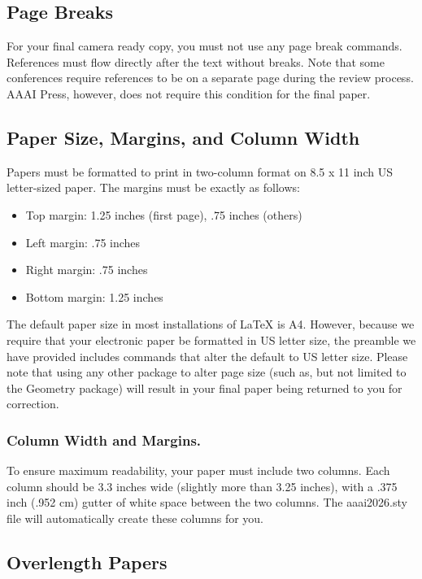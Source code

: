 \subsection{Page Breaks}

For your final camera ready copy, you must not use any page break
commands. References must flow directly after the text without breaks.
Note that some conferences require references to be on a separate page
during the review process. AAAI Press, however, does not require this
condition for the final paper.

\subsection{Paper Size, Margins, and Column Width}

Papers must be formatted to print in two-column format on 8.5 x 11 inch
US letter-sized paper. The margins must be exactly as follows:

\begin{itemize}
\item Top margin: 1.25 inches (first page), .75 inches (others)
\item Left margin: .75 inches
\item Right margin: .75 inches
\item Bottom margin: 1.25 inches
\end{itemize}

The default paper size in most installations of \LaTeX{} is A4. However,
because we require that your electronic paper be formatted in US letter
size, the preamble we have provided includes commands that alter the
default to US letter size. Please note that using any other package to
alter page size (such as, but not limited to the Geometry package) will
result in your final paper being returned to you for correction.

\subsubsection{Column Width and Margins.}

To ensure maximum readability, your paper must include two columns. Each
column should be 3.3 inches wide (slightly more than 3.25 inches), with
a .375 inch (.952 cm) gutter of white space between the two columns. The
aaai2026.sty file will automatically create these columns for you.

\subsection{Overlength Papers}

